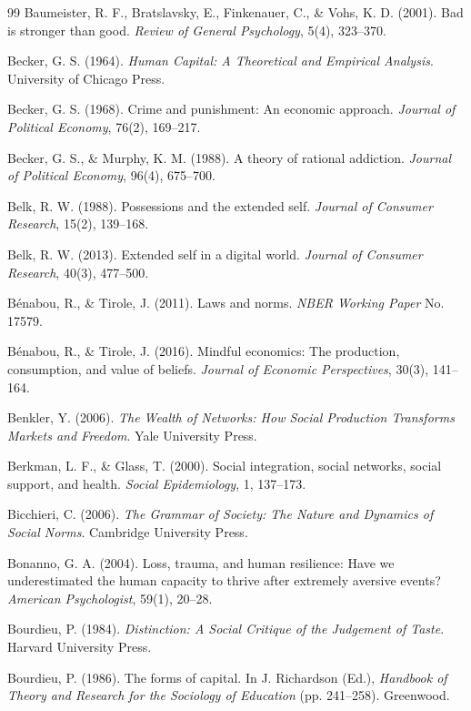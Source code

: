 \begin{thebibliography}{99}
Baumeister, R. F., Bratslavsky, E., Finkenauer, C., \& Vohs, K. D. (2001).
Bad is stronger than good.
\textit{Review of General Psychology}, 5(4), 323--370.

Becker, G. S. (1964).
\textit{Human Capital: A Theoretical and Empirical Analysis}.
University of Chicago Press.

Becker, G. S. (1968).
Crime and punishment: An economic approach.
\textit{Journal of Political Economy}, 76(2), 169--217.

Becker, G. S., \& Murphy, K. M. (1988).
A theory of rational addiction.
\textit{Journal of Political Economy}, 96(4), 675--700.

Belk, R. W. (1988).
Possessions and the extended self.
\textit{Journal of Consumer Research}, 15(2), 139--168.

Belk, R. W. (2013).
Extended self in a digital world.
\textit{Journal of Consumer Research}, 40(3), 477--500.

Bénabou, R., \& Tirole, J. (2011).
Laws and norms.
\textit{NBER Working Paper} No. 17579.

Bénabou, R., \& Tirole, J. (2016).
Mindful economics: The production, consumption, and value of beliefs.
\textit{Journal of Economic Perspectives}, 30(3), 141--164.

Benkler, Y. (2006).
\textit{The Wealth of Networks: How Social Production Transforms Markets and Freedom}.
Yale University Press.

Berkman, L. F., \& Glass, T. (2000).
Social integration, social networks, social support, and health.
\textit{Social Epidemiology}, 1, 137--173.

Bicchieri, C. (2006).
\textit{The Grammar of Society: The Nature and Dynamics of Social Norms}.
Cambridge University Press.

Bonanno, G. A. (2004).
Loss, trauma, and human resilience: Have we underestimated the human capacity to thrive after extremely aversive events?
\textit{American Psychologist}, 59(1), 20--28.

Bourdieu, P. (1984).
\textit{Distinction: A Social Critique of the Judgement of Taste}.
Harvard University Press.

Bourdieu, P. (1986).
The forms of capital.
In J. Richardson (Ed.), \textit{Handbook of Theory and Research for the Sociology of Education} (pp. 241--258).
Greenwood.


\end{thebibliography}
